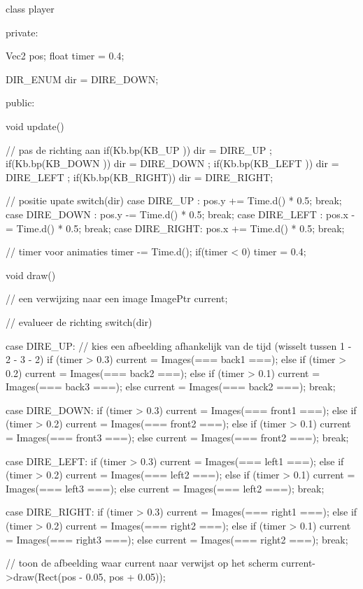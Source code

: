 \begin{code}
class player
{
private:
   
   Vec2 pos;
   float timer = 0.4;
   
   DIR_ENUM dir = DIRE_DOWN;
   
public:   
   
   
   void update()
   {
      // pas de richting aan
      if(Kb.bp(KB_UP   )) dir = DIRE_UP   ;
      if(Kb.bp(KB_DOWN )) dir = DIRE_DOWN ;
      if(Kb.bp(KB_LEFT )) dir = DIRE_LEFT ;
      if(Kb.bp(KB_RIGHT)) dir = DIRE_RIGHT;
      
      // positie upate
      switch(dir)
      {
         case DIRE_UP   : pos.y += Time.d() * 0.5; break;
         case DIRE_DOWN : pos.y -= Time.d() * 0.5; break;
         case DIRE_LEFT : pos.x -= Time.d() * 0.5; break;
         case DIRE_RIGHT: pos.x += Time.d() * 0.5; break;
      }
      
      // timer voor animaties
      timer -= Time.d();
      if(timer < 0) timer = 0.4;
   }
   
   void draw()
   {
      // een verwijzing naar een image
      ImagePtr current;
      
      // evalueer de richting
      switch(dir)
      {
         case DIRE_UP:
         {
            // kies een afbeelding afhankelijk van de tijd (wisselt tussen 1 - 2 - 3 - 2)
            if      (timer > 0.3) current = Images(=== back1 ===);
            else if (timer > 0.2) current = Images(=== back2 ===);
            else if (timer > 0.1) current = Images(=== back3 ===);
            else                  current = Images(=== back2 ===);
            break;
         }
         
         case DIRE_DOWN:
         {
            if      (timer > 0.3) current = Images(=== front1 ===);
            else if (timer > 0.2) current = Images(=== front2 ===);
            else if (timer > 0.1) current = Images(=== front3 ===);
            else                  current = Images(=== front2 ===);
            break;
         }
         
         case DIRE_LEFT:
         {
            if      (timer > 0.3) current = Images(=== left1 ===);
            else if (timer > 0.2) current = Images(=== left2 ===);
            else if (timer > 0.1) current = Images(=== left3 ===);
            else                  current = Images(=== left2 ===);
            break;
         }
         
         case DIRE_RIGHT:
         {
            if      (timer > 0.3) current = Images(=== right1 ===);
            else if (timer > 0.2) current = Images(=== right2 ===);
            else if (timer > 0.1) current = Images(=== right3 ===);
            else                  current = Images(=== right2 ===);
            break;
         }
      }
      
      // toon de afbeelding waar current naar verwijst op het scherm
      current->draw(Rect(pos - 0.05, pos + 0.05));
   }   
}
\end{code}

